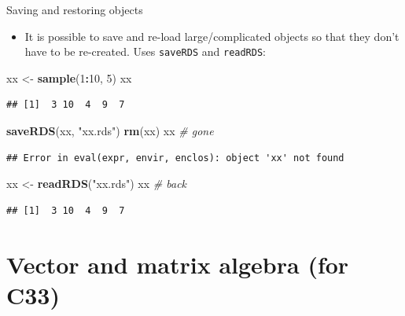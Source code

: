 \documentclass[ignorenonframetext,]{beamer}
\newenvironment{Shaded}{\begin{snugshade}}{\end{snugshade}}
\newcommand{\CommentTok}[1]{\textcolor[rgb]{0.56,0.35,0.01}{\textit{#1}}}
\newcommand{\DecValTok}[1]{\textcolor[rgb]{0.00,0.00,0.81}{#1}}
\newcommand{\KeywordTok}[1]{\textcolor[rgb]{0.13,0.29,0.53}{\textbf{#1}}}
\newcommand{\NormalTok}[1]{#1}
\newcommand{\OperatorTok}[1]{\textcolor[rgb]{0.81,0.36,0.00}{\textbf{#1}}}
\newcommand{\StringTok}[1]{\textcolor[rgb]{0.31,0.60,0.02}{#1}}
\providecommand{\tightlist}{%
  \setlength{\itemsep}{0pt}\setlength{\parskip}{0pt}}
\begin{document}
\begin{frame}[fragile]{Saving and restoring objects}
\protect\hypertarget{saving-and-restoring-objects}{}

\begin{itemize}
\tightlist
\item
  It is possible to save and re-load large/complicated objects so that
  they don't have to be re-created. Uses \texttt{saveRDS} and
  \texttt{readRDS}:
\end{itemize}

\begin{Shaded}
\begin{Highlighting}[]
\NormalTok{xx <-}\StringTok{ }\KeywordTok{sample}\NormalTok{(}\DecValTok{1}\OperatorTok{:}\DecValTok{10}\NormalTok{, }\DecValTok{5}\NormalTok{)}
\NormalTok{xx}
\end{Highlighting}
\end{Shaded}

\begin{verbatim}
## [1]  3 10  4  9  7
\end{verbatim}

\begin{Shaded}
\begin{Highlighting}[]
\KeywordTok{saveRDS}\NormalTok{(xx, }\StringTok{"xx.rds"}\NormalTok{)}
\KeywordTok{rm}\NormalTok{(xx)}
\NormalTok{xx }\CommentTok{# gone}
\end{Highlighting}
\end{Shaded}

\begin{verbatim}
## Error in eval(expr, envir, enclos): object 'xx' not found
\end{verbatim}

\begin{Shaded}
\begin{Highlighting}[]
\NormalTok{xx <-}\StringTok{ }\KeywordTok{readRDS}\NormalTok{(}\StringTok{"xx.rds"}\NormalTok{)}
\NormalTok{xx }\CommentTok{# back}
\end{Highlighting}
\end{Shaded}

\begin{verbatim}
## [1]  3 10  4  9  7
\end{verbatim}

\end{frame}

\hypertarget{vector-and-matrix-algebra-for-c33}{%
\section{Vector and matrix algebra (for
C33)}\label{vector-and-matrix-algebra-for-c33}}
\end{document}
